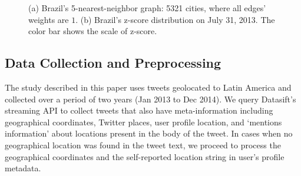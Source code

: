 \begin{figure}[t]
	\centering
    \vspace{-2mm}
	\caption{(a) Brazil's 5-nearest-neighbor graph: 5321 cities, where
all edges' weights are $1$. (b) Brazil's z-score distribution on July 31, 2013. The color bar shows the scale of z-score.}
	\label{fig:knn_zscore}
\end{figure}

\subsection{Data Collection and Preprocessing}
\label{sec:data_collection}
The study described in this paper uses tweets geolocated to Latin America and collected over a period of two years (Jan 2013 to Dec 2014). We query Datasift's streaming API to collect tweets that also have meta-information including geographical coordinates, Twitter places, user profile location, and `mentions information' about locations present in the body of the tweet.
In cases when no geographical location was found in the tweet text, we
proceed to process the geographical coordinates and the self-reported location string in user's profile metadata.

